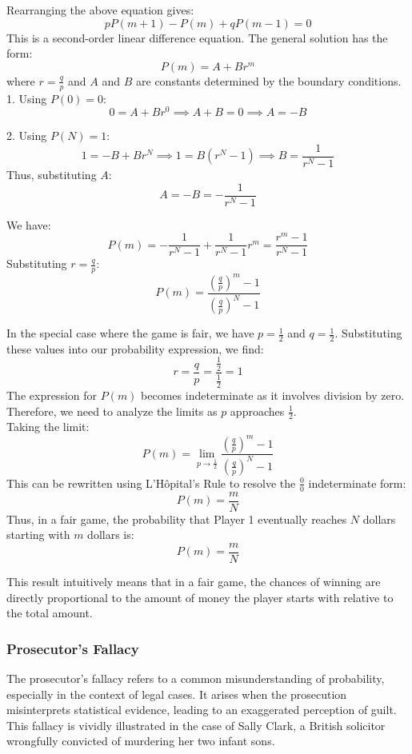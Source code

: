 Rearranging the above equation gives:
\[
p P(m+1) - P(m) + q P(m-1) = 0
\]
This is a second-order linear difference equation. The general solution has the form:
\[
P(m) = A + B r^m
\]
where \( r = \frac{q}{p} \) and \( A \) and \( B \) are constants determined by the boundary conditions. \\

1. Using \( P(0) = 0 \):
   \[
   0 = A + B r^0 \implies A + B = 0 \implies A = -B
   \]

2. Using \( P(N) = 1 \):
   \[
   1 = -B + B r^N \implies 1 = B (r^N - 1) \implies B = \frac{1}{r^N - 1}
   \]
   Thus, substituting \( A \):
   \[
   A = -B = -\frac{1}{r^N - 1}
   \]

We have:
\[
P(m) = -\frac{1}{r^N - 1} + \frac{1}{r^N - 1} r^m = \frac{r^m - 1}{r^N - 1}
\]
Substituting \( r = \frac{q}{p} \):
\[
P(m) = \frac{\left( \frac{q}{p} \right)^m - 1}{\left( \frac{q}{p} \right)^N - 1}
\]

In the special case where the game is fair, we have \( p = \frac{1}{2} \) and \( q = \frac{1}{2} \). Substituting these values into our probability expression, we find:
\[
r = \frac{q}{p} = \frac{\frac{1}{2}}{\frac{1}{2}} = 1
\]
The expression for \( P(m) \) becomes indeterminate as it involves division by zero. Therefore, we need to analyze the limits as \( p \) approaches \( \frac{1}{2} \).\\

Taking the limit:
\[
P(m) = \lim_{p \to \frac{1}{2}} \frac{\left( \frac{q}{p} \right)^m - 1}{\left( \frac{q}{p} \right)^N - 1}
\]
This can be rewritten using L'Hôpital's Rule to resolve the \( \frac{0}{0} \) indeterminate form:
\[
P(m) = \frac{m}{N}
\]
Thus, in a fair game, the probability that Player 1 eventually reaches \( N \) dollars starting with \( m \) dollars is:
\[
P(m) = \frac{m}{N}
\]

This result intuitively means that in a fair game, the chances of winning are directly proportional to the amount of money the player starts with relative to the total amount.

\subsubsection{Prosecutor's Fallacy}

The prosecutor's fallacy refers to a common misunderstanding of probability, especially in the context of legal cases. It arises when the prosecution misinterprets statistical evidence, leading to an exaggerated perception of guilt. This fallacy is vividly illustrated in the case of Sally Clark, a British solicitor wrongfully convicted of murdering her two infant sons.\\

